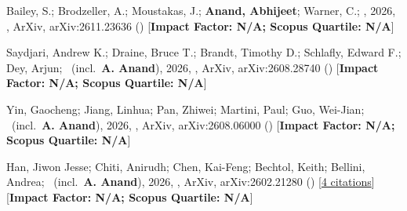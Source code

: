 \item[{\color{numcolor}\scriptsize4}] Bailey, S.; Brodzeller, A.; Moustakas, J.; \textbf{Anand, Abhijeet}; Warner, C.; \etal, 2026, , ArXiv, arXiv:2611.23636 () [\textbf{Impact Factor: N/A; Scopus Quartile: N/A}]

\item[{\color{numcolor}\scriptsize3}] Saydjari, Andrew K.; Draine, Bruce T.; Brandt, Timothy D.; Schlafly, Edward F.; Dey, Arjun; \etal\ (incl.\ \textbf{A. Anand}), 2026, , ArXiv, arXiv:2608.28740 () [\textbf{Impact Factor: N/A; Scopus Quartile: N/A}]

\item[{\color{numcolor}\scriptsize2}] Yin, Gaocheng; Jiang, Linhua; Pan, Zhiwei; Martini, Paul; Guo, Wei-Jian; \etal\ (incl.\ \textbf{A. Anand}), 2026, , ArXiv, arXiv:2608.06000 () [\textbf{Impact Factor: N/A; Scopus Quartile: N/A}]

\item[{\color{numcolor}\scriptsize1}] Han, Jiwon Jesse; Chiti, Anirudh; Chen, Kai-Feng; Bechtol, Keith; Bellini, Andrea; \etal\ (incl.\ \textbf{A. Anand}), 2026, , ArXiv, arXiv:2602.21280 () [\href{https://ui.adsabs.harvard.edu/abs/2026arXiv260221280H}{4 citations}] [\textbf{Impact Factor: N/A; Scopus Quartile: N/A}]